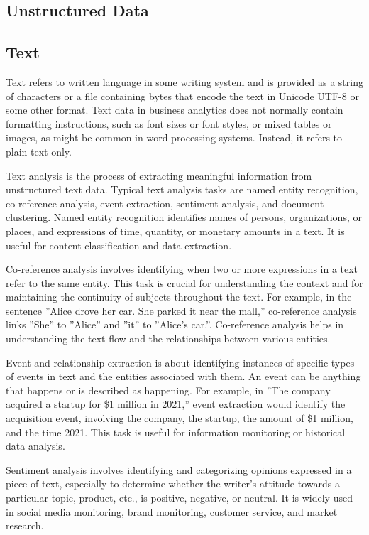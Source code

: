 \subsection{Unstructured Data}

\subsection*{Text}

Text refers to written language in some writing system and is provided as a string of characters or a file containing bytes that encode the text in Unicode UTF-8 or some other format. Text data in business analytics does not normally contain formatting instructions, such as font sizes or font styles, or mixed tables or images, as might be common in word processing systems. Instead, it refers to plain text only. 

Text analysis is the process of extracting meaningful information from unstructured text data. Typical text analysis tasks are named entity recognition, co-reference analysis, event extraction, sentiment analysis, and document clustering. Named entity recognition identifies names of persons, organizations, or places, and expressions of time, quantity, or monetary amounts in a text. It is useful for content classification and data extraction. 

Co-reference analysis involves identifying when two or more expressions in a text refer to the same entity. This task is crucial for understanding the context and for maintaining the continuity of subjects throughout the text. For example, in the sentence ''Alice drove her car. She parked it near the mall,'' co-reference analysis links ''She'' to ''Alice'' and ''it'' to ''Alice's car.''. Co-reference analysis helps in understanding the text flow and the relationships between various entities.
    
Event and relationship extraction  is about identifying instances of specific types of events in text and the entities associated with them. An event can be anything that happens or is described as happening. For example, in ''The company acquired a startup for \$1 million in 2021,'' event extraction would identify the acquisition event, involving the company, the startup, the amount of \$1 million, and the time 2021. This task is useful for information monitoring or historical data analysis. 

Sentiment analysis involves identifying and categorizing opinions expressed in a piece of text, especially to determine whether the writer's attitude towards a particular topic, product, etc., is positive, negative, or neutral. It is widely used in social media monitoring, brand monitoring, customer service, and market research.

